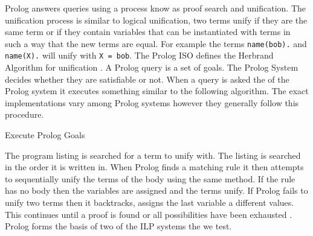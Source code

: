 Prolog answers queries using a process know as proof search and unification. The unification process is similar to logical unification, two terms unify if they are the same term or if they contain variables that can be instantiated with terms in such a way that the new terms are equal. For example the terms \texttt{name(bob).} and \texttt{name(X).} will unify with \texttt{X = bob}. The Prolog ISO defines the Herbrand Algorithm for unification  \cite{PrologISO}. A Prolog query is a set of goals. The Prolog System decides whether they are satisfiable or not. When a query is asked the of the Prolog system it executes something similar to the following algorithm. The exact implementations vary among Prolog systems however they generally follow this procedure.
\begin{algorithm}
	\caption{Execute Prolog Goals}
\end{algorithm}

The program listing is searched for a term to unify with. The listing is searched in the order it is written in. When Prolog finds a matching rule it then attempts to sequentially unify the terms of the body using the same method. If the rule has no body then the variables are assigned and the terms unify. If Prolog fails to unify two terms then it backtracks, assigns the last variable a different values. This continues until a proof is found or all possibilities have been exhausted \cite{Bratko}. Prolog forms the basis of two of the ILP systems the we test.



